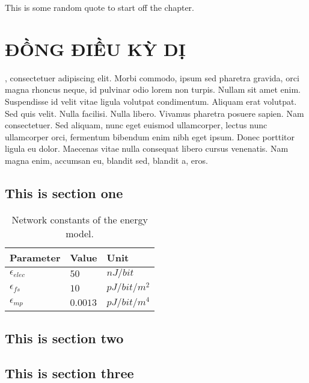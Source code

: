 \begin{savequote}[75mm] 
This is some random quote to start off the chapter.
\end{savequote}

\chapter{ĐỒNG ĐIỀU KỲ DỊ}

, consectetuer adipiscing elit. Morbi commodo, ipsum sed pharetra gravida, orci magna rhoncus neque, id pulvinar odio lorem non turpis. Nullam sit amet enim. Suspendisse id velit vitae ligula volutpat condimentum. Aliquam erat volutpat. Sed quis velit. Nulla facilisi. Nulla libero. Vivamus pharetra posuere sapien. Nam consectetuer. Sed aliquam, nunc eget euismod ullamcorper, lectus nunc ullamcorper orci, fermentum bibendum enim nibh eget ipsum. Donec porttitor ligula eu dolor. Maecenas vitae nulla consequat libero cursus venenatis. Nam magna enim, accumsan eu, blandit sed, blandit a, eros.

\section{This is section one}
\blindtext

\blinditemize

\begin{table}[tb]
  \centering
  \caption{Network constants of the energy model.}
  \label{tab:network_constants}
  \small
  \begin{tabular}{lll}
    \toprule
    Parameter & Value & Unit \\
    \midrule
    $\epsilon_{elec}$ & $50$ &  $nJ/bit$ \\
    $\epsilon_{fs}$ & $10$ & $pJ/bit/m^2$ \\
    $\epsilon_{mp}$ & $0.0013$ & $pJ/bit/m^4$ \\
    \bottomrule
  \end{tabular}
\end{table} 


\blindmathpaper

\blindtext@formula 

\section{This is section two}
\blindtext
\blindmathpaper

\section{This is section three}
\blindtext
\blindmathpaper